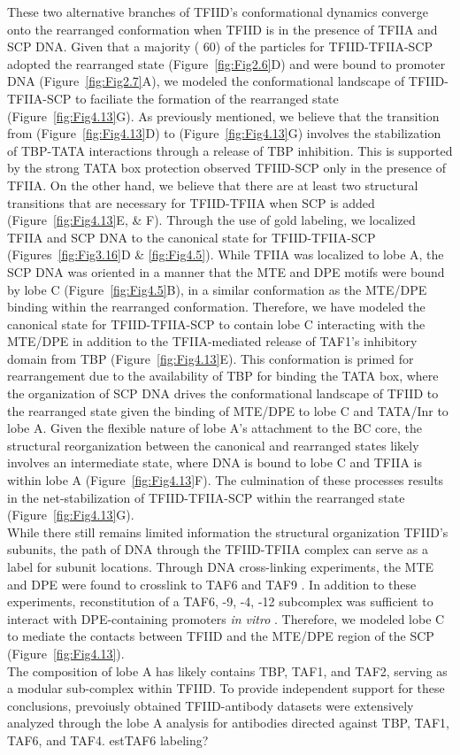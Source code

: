 \indent These two alternative branches of TFIID's conformational dynamics converge onto the rearranged conformation when TFIID is in the presence of TFIIA and SCP DNA. Given that a majority ( 60) of the particles for TFIID-TFIIA-SCP adopted the rearranged state (Figure~\ref{fig:Fig2.6}D) and were bound to promoter DNA (Figure~\ref{fig:Fig2.7}A), we modeled the conformational landscape of TFIID-TFIIA-SCP to faciliate the formation of the rearranged state (Figure~\ref{fig:Fig4.13}G). As previously mentioned, we believe that the transition from (Figure~\ref{fig:Fig4.13}D) to (Figure~\ref{fig:Fig4.13}G) involves the stabilization of TBP-TATA interactions through a release of TBP inhibition. This is supported by the strong TATA box protection observed  TFIID-SCP only in the presence of TFIIA. On the other hand, we believe that there are at least two structural transitions that are necessary for TFIID-TFIIA when SCP is added (Figure~\ref{fig:Fig4.13}E, \& F). Through the use of gold labeling, we localized TFIIA and SCP DNA to the canonical state for TFIID-TFIIA-SCP (Figures~\ref{fig:Fig3.16}D \& \ref{fig:Fig4.5}). While TFIIA was localized to lobe A, the SCP DNA was oriented in a manner that the MTE and DPE motifs were bound by lobe C (Figure~\ref{fig:Fig4.5}B), in a similar conformation as the MTE/DPE binding within the rearranged conformation. Therefore, we have modeled the canonical state for TFIID-TFIIA-SCP to contain lobe C interacting with the MTE/DPE in addition to the TFIIA-mediated release of TAF1's inhibitory domain from TBP (Figure~\ref{fig:Fig4.13}E). This conformation is primed for rearrangement due to the availability of TBP for binding the TATA box, where the organization of SCP DNA drives the conformational landscape of TFIID to the rearranged state given the binding of MTE/DPE to lobe C and TATA/Inr to lobe A. Given the flexible nature of lobe A's attachment to the BC core, the structural reorganization between the canonical and rearranged states likely involves an intermediate state, where DNA is bound to lobe C and TFIIA is within lobe A (Figure~\ref{fig:Fig4.13}F). The culmination of these processes results in the net-stabilization of TFIID-TFIIA-SCP within the rearranged state (Figure~\ref{fig:Fig4.13}G).\\ 
\indent While there still remains limited information the structural organization TFIID's subunits, the path of DNA through the TFIID-TFIIA complex can serve as a label for subunit locations. Through DNA cross-linking experiments, the MTE and DPE were found to crosslink to TAF6 and TAF9 \cite{Burke_2739,Lim_1522}. In addition to these experiments, reconstitution of a TAF6, -9, -4, -12 subcomplex was sufficient to interact with DPE-containing promoters \emph{in vitro} \cite{Shao_1340}. Therefore, we modeled lobe C to mediate the contacts between TFIID and the MTE/DPE region of the SCP (Figure~\ref{fig:Fig4.13}).\\
\indent The composition of lobe A has likely contains TBP, TAF1, and TAF2, serving as a modular sub-complex within TFIID. 
\indent To provide independent support for these conclusions, prevoiusly obtained TFIID-antibody datasets were extensively analyzed through the lobe A analysis for antibodies directed against TBP, TAF1, TAF6, and TAF4.   estTAF6 labeling?

